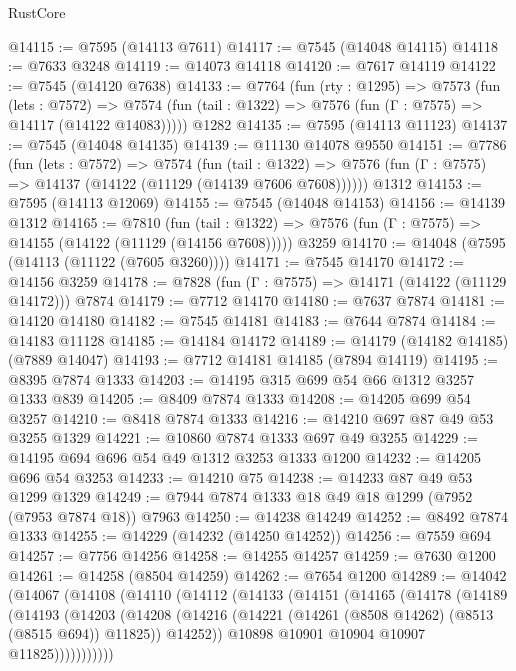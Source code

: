 \begin{lexlean}{RustCore}
\begin{coremodule}
@14115 := @7595 (@14113 @7611)
@14117 := @7545 (@14048 @14115)
@14118 := @7633 @3248
@14119 := @14073 @14118
@14120 := @7617 @14119
@14122 := @7545 (@14120 @7638)
@14133 := @7764
    (fun (rty : @1295) =>
    @7573
      (fun (lets : @7572) =>
      @7574 (fun (tail : @1322) => @7576 (fun (Γ : @7575) => @14117 (@14122 @14083)))))
    @1282
@14135 := @7595 (@14113 @11123)
@14137 := @7545 (@14048 @14135)
@14139 := @11130 @14078 @9550
@14151 := @7786
    (fun (lets : @7572) =>
    @7574
      (fun (tail : @1322) =>
      @7576 (fun (Γ : @7575) => @14137 (@14122 (@11129 (@14139 @7606 @7608))))))
    @1312
@14153 := @7595 (@14113 @12069)
@14155 := @7545 (@14048 @14153)
@14156 := @14139 @1312
@14165 := @7810
    (fun (tail : @1322) => @7576 (fun (Γ : @7575) => @14155 (@14122 (@11129 (@14156 @7608)))))
    @3259
@14170 := @14048 (@7595 (@14113 (@11122 (@7605 @3260))))
@14171 := @7545 @14170
@14172 := @14156 @3259
@14178 := @7828 (fun (Γ : @7575) => @14171 (@14122 (@11129 @14172))) @7874
@14179 := @7712 @14170
@14180 := @7637 @7874
@14181 := @14120 @14180
@14182 := @7545 @14181
@14183 := @7644 @7874
@14184 := @14183 @11128
@14185 := @14184 @14172
@14189 := @14179 (@14182 @14185) (@7889 @14047)
@14193 := @7712 @14181 @14185 (@7894 @14119)
@14195 := @8395 @7874 @1333
@14203 := @14195 @315 @699 @54 @66 @1312 @3257 @1333 @839
@14205 := @8409 @7874 @1333
@14208 := @14205 @699 @54 @3257
@14210 := @8418 @7874 @1333
@14216 := @14210 @697 @87 @49 @53 @3255 @1329
@14221 := @10860 @7874 @1333 @697 @49 @3255
@14229 := @14195 @694 @696 @54 @49 @1312 @3253 @1333 @1200
@14232 := @14205 @696 @54 @3253
@14233 := @14210 @75
@14238 := @14233 @87 @49 @53 @1299 @1329
@14249 := @7944 @7874 @1333 @18 @49 @18 @1299 (@7952 (@7953 @7874 @18)) @7963
@14250 := @14238 @14249
@14252 := @8492 @7874 @1333
@14255 := @14229 (@14232 (@14250 @14252))
@14256 := @7559 @694
@14257 := @7756 @14256
@14258 := @14255 @14257
@14259 := @7630 @1200
@14261 := @14258 (@8504 @14259)
@14262 := @7654 @1200
@14289 := @14042
    (@14067
      (@14108
        (@14110
          (@14112
            (@14133
              (@14151
                (@14165
                  (@14178
                    (@14189
                      (@14193
                        (@14203
                          (@14208
                            (@14216
                              (@14221 (@14261 (@8508 @14262) (@8513 (@8515 @694)) @11825))
                              @14252))
                          @10898
                          @10901
                          @10904
                          @10907
                          @11825)))))))))))

\end{coremodule}
\end{lexlean}
